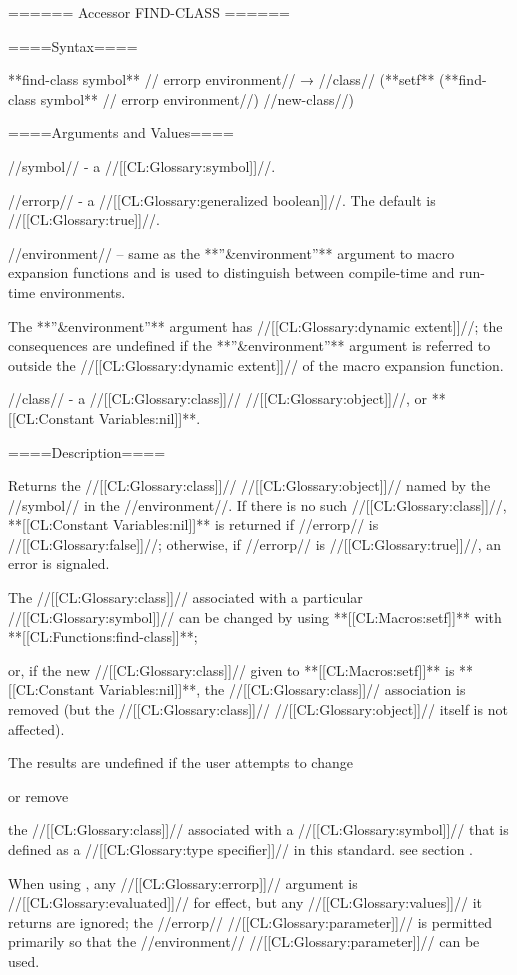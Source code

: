 ====== Accessor FIND-CLASS ======

====Syntax====

**find-class {symbol** //\opt} errorp environment// → //class// (**setf** (**find-class {symbol** //\opt} errorp environment//) //new-class//)

====Arguments and Values====

//symbol// - a //[[CL:Glossary:symbol]]//.

//errorp// - a //[[CL:Glossary:generalized boolean]]//. The default is //[[CL:Glossary:true]]//.

//environment// -- same as the **''&environment''** argument to macro expansion functions and is used to distinguish between compile-time and run-time environments.

The **''&environment''** argument has //[[CL:Glossary:dynamic extent]]//; the consequences are undefined if the **''&environment''** argument is referred to outside the //[[CL:Glossary:dynamic extent]]// of the macro expansion function.


//class// - a //[[CL:Glossary:class]]// //[[CL:Glossary:object]]//, or **[[CL:Constant Variables:nil]]**.

====Description====

Returns the //[[CL:Glossary:class]]// //[[CL:Glossary:object]]// named by the //symbol// in the //environment//. If there is no such //[[CL:Glossary:class]]//, **[[CL:Constant Variables:nil]]** is returned if //errorp// is //[[CL:Glossary:false]]//; otherwise, if //errorp// is //[[CL:Glossary:true]]//, an error is signaled.

The //[[CL:Glossary:class]]// associated with a particular //[[CL:Glossary:symbol]]// can be changed by using **[[CL:Macros:setf]]** with **[[CL:Functions:find-class]]**;

or, if the new //[[CL:Glossary:class]]// given to **[[CL:Macros:setf]]** is **[[CL:Constant Variables:nil]]**, the //[[CL:Glossary:class]]// association is removed (but the //[[CL:Glossary:class]]// //[[CL:Glossary:object]]// itself is not affected).

The results are undefined if the user attempts to change

or remove

the //[[CL:Glossary:class]]// associated with a //[[CL:Glossary:symbol]]// that is defined as a //[[CL:Glossary:type specifier]]// in this standard. see section {\secref\IntegratingTypesAndClasses}.

When using , any //[[CL:Glossary:errorp]]// argument is //[[CL:Glossary:evaluated]]// for effect, but any //[[CL:Glossary:values]]// it returns are ignored; the //errorp// //[[CL:Glossary:parameter]]// is permitted primarily so that the //environment// //[[CL:Glossary:parameter]]// can be used.

